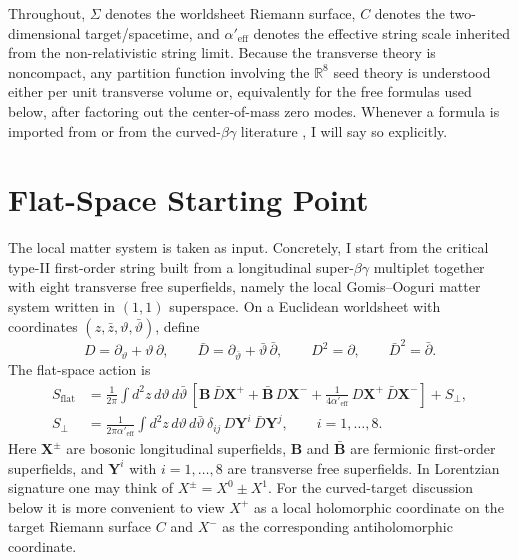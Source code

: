 \documentclass[11pt]{article}
\newcommand{\Aeff}{\alpha'_{\mathrm{eff}}}
\newcommand{\bR}{\mathbb{R}}
\begin{document}
Throughout, $\Sigma$ denotes the worldsheet Riemann surface, $C$ denotes the two-dimensional target/spacetime, and $\Aeff$ denotes the effective string scale inherited from the non-relativistic string limit. Because the transverse theory is noncompact, any partition function involving the $\bR^8$ seed theory is understood either per unit transverse volume or, equivalently for the free formulas used below, after factoring out the center-of-mass zero modes. Whenever a formula is imported from \cite{gomis2000nonrelativisticclosedstringtheory} or from the curved-$\beta\gamma$ literature \cite{nekrasov2005curvedbetagammasystems}, I will say so explicitly.

\section{Flat-Space Starting Point}
The local matter system is taken as input. Concretely, I start from the critical type-II first-order string built from a longitudinal super-$\beta\gamma$ multiplet together with eight transverse free superfields, namely the local Gomis--Ooguri matter system written in $(1,1)$ superspace. On a Euclidean worldsheet with coordinates $(z,\bar z,\vartheta,\bar\vartheta)$, define
\begin{equation}\label{eq:superderivatives}
D=\partial_\vartheta+\vartheta\,\partial,
\qquad
\bar D=\partial_{\bar\vartheta}+\bar\vartheta\,\bar\partial,
\qquad
D^2=\partial,
\qquad
\bar D^2=\bar\partial.
\end{equation}
The flat-space action is
\begin{equation}\label{eq:flat-action}
\begin{aligned}
S_{\mathrm{flat}}
&=
\frac{1}{2\pi}\int d^2z\,d\vartheta\,d\bar\vartheta\,
\left[
\mathbf B\,\bar D\mathbf X^+
+\bar{\mathbf B}\,D\mathbf X^-
+\frac{1}{4\Aeff}\,D\mathbf X^+\,\bar D\mathbf X^-
\right]
+S_\perp,
\\
S_\perp
&=
\frac{1}{2\pi \Aeff}\int d^2z\,d\vartheta\,d\bar\vartheta\,
\delta_{ij}\,D\mathbf Y^i\,\bar D\mathbf Y^j,
\qquad i=1,\dots,8.
\end{aligned}
\end{equation}
Here $\mathbf X^\pm$ are bosonic longitudinal superfields, $\mathbf B$ and $\bar{\mathbf B}$ are fermionic first-order superfields, and $\mathbf Y^i$ with $i=1,\dots,8$ are transverse free superfields.
In Lorentzian signature one may think of $X^\pm=X^0\pm X^1$. For the curved-target discussion below it is more convenient to view $X^+$ as a local holomorphic coordinate on the target Riemann surface $C$ and $X^-$ as the corresponding antiholomorphic coordinate.
\end{document}

